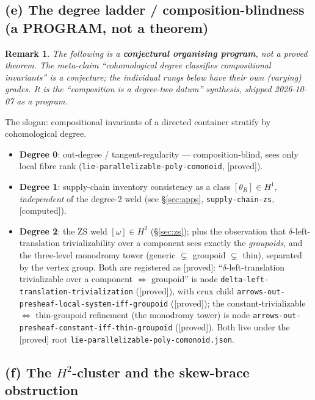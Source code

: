 \documentclass[11pt]{article}
\newcommand{\reg}[1]{\texttt{#1}}
\newcommand{\grade}[1]{\textsf{[#1]}}
\newtheorem*{remark}{Remark}
\begin{document}
\subsection{(e) The degree ladder / composition-blindness (a PROGRAM, not a theorem)}\label{sec:ladder}

\begin{remark}
The following is a \textbf{conjectural organising program}, not a proved theorem. The
meta-claim ``cohomological degree classifies compositional invariants'' is a conjecture;
the individual rungs below have their own (varying) grades. It is the ``composition is a
degree-two datum'' synthesis, shipped 2026-10-07 as a \emph{program}.
\end{remark}

The slogan: compositional invariants of a directed container stratify by cohomological
degree.
\begin{itemize}[leftmargin=1.2em]
\item \textbf{Degree 0}: out-degree / tangent-regularity --- composition-blind, sees only
local fibre rank (\reg{lie-parallelizable-poly-comonoid}, \grade{proved}).
\item \textbf{Degree 1}: supply-chain inventory consistency as a class
$[\theta_R]\in H^1$, \emph{independent} of the degree-2 weld (see \S\ref{sec:apps},
\reg{supply-chain-zs}, \grade{computed}).
\item \textbf{Degree 2}: the ZS weld $[\omega]\in H^2$ (\S\ref{sec:zs}); plus the
observation that $\delta$-left-translation trivializability over a component sees exactly
the \emph{groupoids}, and the three-level monodromy tower
(generic $\subsetneq$ groupoid $\subsetneq$ thin), separated by the vertex group. Both are
registered as \grade{proved}: ``$\delta$-left-translation trivializable over a component
$\Leftrightarrow$ groupoid'' is node \reg{delta-left-translation-trivialization}
(\grade{proved}), with crux child
\reg{arrows-out-presheaf-local-system-iff-groupoid} (\grade{proved}); the
constant-trivializable $\Leftrightarrow$ thin-groupoid refinement (the monodromy tower) is
node \reg{arrows-out-presheaf-constant-iff-thin-groupoid} (\grade{proved}). Both live under
the \grade{proved} root \reg{lie-parallelizable-poly-comonoid.json}.
\end{itemize}

\subsection{(f) The $H^2$-cluster and the skew-brace obstruction}\label{sec:h2}
\end{document}
